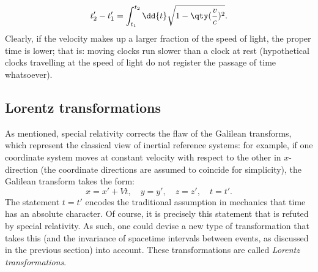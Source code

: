 \begin{equation}
    t'_2 - t'_1 = \int^{t_2}_{t_1} \dd{t} \sqrt{1 - \qty(\frac{v}{c})^2}.
    \label{eq:proper_time}
\end{equation}
Clearly, if the velocity makes up a larger fraction of the speed of light, the proper time is lower; that is: moving clocks run slower than a clock at rest (hypothetical clocks travelling at the speed of light do not register the passage of time whatsoever).

\subsection{Lorentz transformations}
As mentioned, special relativity corrects the flaw of the Galilean transforms, which represent the classical view of inertial reference systems: for example, if one coordinate system moves at constant velocity with respect to the other in \(x\)-direction (the coordinate directions are assumed to coincide for simplicity), the Galilean transform takes the form:
\begin{equation}
    x = x' + Vt, \quad y = y', \quad z = z',\quad t = t'.
    \label{eq:galilean_transform}
\end{equation}
The statement \(t = t'\) encodes the traditional assumption in mechanics that time has an absolute character. Of course, it is precisely this statement that is refuted by special relativity. As such, one could devise a new type of transformation that takes this (and the invariance of spacetime intervals between events, as discussed in the previous section) into account. These transformations are called \emph{Lorentz transformations}. 


